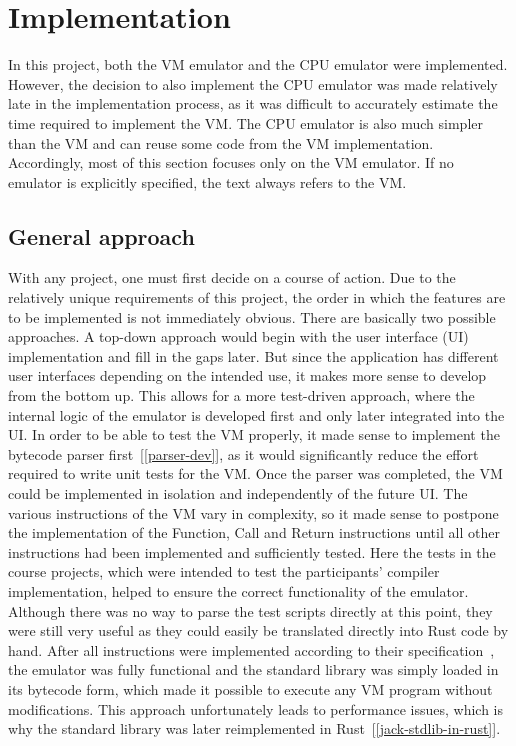 \section{Implementation} \label{implementation}
In this project, both the VM emulator and the CPU emulator were implemented.
However, the decision to also implement the CPU emulator was made relatively late in the implementation process, as it was difficult to accurately estimate the time required to implement the VM.
The CPU emulator is also much simpler than the VM and can reuse some code from the VM implementation.
Accordingly, most of this section focuses only on the VM emulator.
If no emulator is explicitly specified, the text always refers to the VM.

\subsection{General approach}
With any project, one must first decide on a course of action.
Due to the relatively unique requirements of this project, the order in which the features are to be implemented is not immediately obvious.
There are basically two possible approaches.
A top-down approach would begin with the user interface (UI) implementation and fill in the gaps later.
But since the application has different user interfaces depending on the intended use, it makes more sense to develop from the bottom up.
This allows for a more test-driven approach, where the internal logic of the emulator is developed first and only later integrated into the UI.
In order to be able to test the VM properly, it made sense to implement the bytecode parser first~[\ref{parser-dev}], as it would significantly reduce the effort required to write unit tests for the VM.
Once the parser was completed, the VM could be implemented in isolation and independently of the future UI.
The various instructions of the VM vary in complexity, so it made sense to postpone the implementation of the Function, Call and Return instructions until all other instructions had been implemented and sufficiently tested.
Here the tests in the course projects, which were intended to test the participants' compiler implementation, helped to ensure the correct functionality of the emulator.
Although there was no way to parse the test scripts directly at this point, they were still very useful as they could easily be translated directly into Rust code by hand.
After all instructions were implemented according to their specification~\cite{nisan2005}, the emulator was fully functional and the standard library was simply loaded in its bytecode form, which made it possible to execute any VM program without modifications.
This approach unfortunately leads to performance issues, which is why the standard library was later reimplemented in Rust~[\ref{jack-stdlib-in-rust}].

